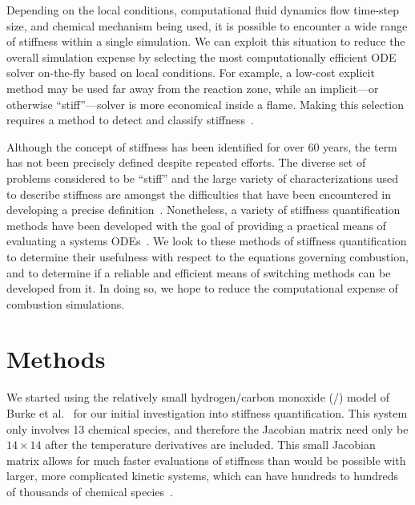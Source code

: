 \documentclass[12pt]{ussci}
\begin{document}
Depending on the local conditions, computational fluid dynamics flow time-step size, and chemical mechanism being used, it is possible to encounter a wide range of stiffness within a single simulation.
We can exploit this situation to reduce the overall simulation expense by selecting the most computationally efficient ODE solver on-the-fly based on local conditions.
For example, a low-cost explicit method may be used far away from the reaction zone, while an implicit---or otherwise ``stiff''---solver is more economical inside a flame.
Making this selection requires a method to detect and classify stiffness~\cite{Niemeyer}.

Although the concept of stiffness has been identified for over 60 years, the term has not been precisely defined despite repeated efforts.
The diverse set of problems considered to be ``stiff'' and the large variety of characterizations used to describe stiffness are amongst the difficulties that have been encountered in developing a precise definition~\cite{Soderlind2014}.
Nonetheless, a variety of stiffness quantification methods have been developed with the goal of providing a practical means of evaluating a systems ODEs~\cite{Soderlind2014,Shampine1985,Brugnano2011,Lambert1973ComputationalEquations,Hairer1996SolvingII}.
We look to these methods of stiffness quantification to determine their usefulness with respect to the equations governing combustion, and to determine if a reliable and efficient means of switching methods can be developed from it.
In doing so, we hope to reduce the computational expense of combustion simulations.

\section{Methods}
We started using the relatively small hydrogen\slash carbon monoxide (\slash {}) model of Burke et al.~\cite{Burke:2011fh} for our initial investigation into stiffness quantification.
This system only involves 13 chemical species, and therefore the Jacobian matrix need only be $14\times14$ after the temperature derivatives are included.
This small Jacobian matrix allows for much faster evaluations of stiffness than would be possible with larger, more complicated kinetic systems, which can have hundreds to hundreds of thousands of chemical species~\cite{Niemeyer:2013}.
\end{document}
